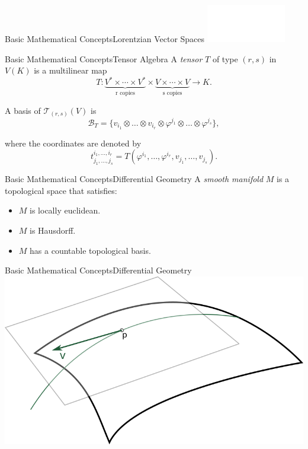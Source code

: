 \begin{frame}{Basic Mathematical Concepts}{Lorentzian Vector Spaces}
	\centering
	\includegraphics[height=0.7\paperheight]{gfx/timecones}
\end{frame}

\begin{frame}{Basic Mathematical Concepts}{Tensor Algebra}
	A \emph{tensor} $T$ of type $(r, s)$ in $V(K)$ is a multilinear map
	\[
		T \colon \underbrace{V^* \times \cdots \times V^*}_{\text{r copies}} \times \underbrace{V \times \cdots \times V}_{\text{s copies}} \longrightarrow K.
	\]
	
	\pause
	
	A basis of $\mathcal{T}_{(r,s)}(V)$ is
	\[
		\mathcal{B}_T = \{v_{i_1} \otimes \dots \otimes v_{i_r} \otimes \varphi^{j_1} \otimes \dots \otimes \varphi^{j_s}\},
	\]
	
	\pause
	where the coordinates are denoted by \[t^{i_1,\dots,i_r}_{j_1,\dots,j_s} = T(\varphi^{i_1}, \dots, \varphi^{i_r}, v_{j_1}, \dots, v_{j_s}).\]
\end{frame}

\begin{frame}{Basic Mathematical Concepts}{Differential Geometry}
	A \emph{smooth manifold} $M$ is a topological space that satisfies:
	\begin{itemize}
		\item $M$ is locally euclidean.
		\pause
		\item $M$ is Hausdorff.
		\pause
		\item $M$ has a countable topological basis.
	\end{itemize}
\end{frame}

\begin{frame}{Basic Mathematical Concepts}{Differential Geometry}
	\centering
	\includegraphics[height=0.4\paperwidth]{gfx/planotangente}
\end{frame}

